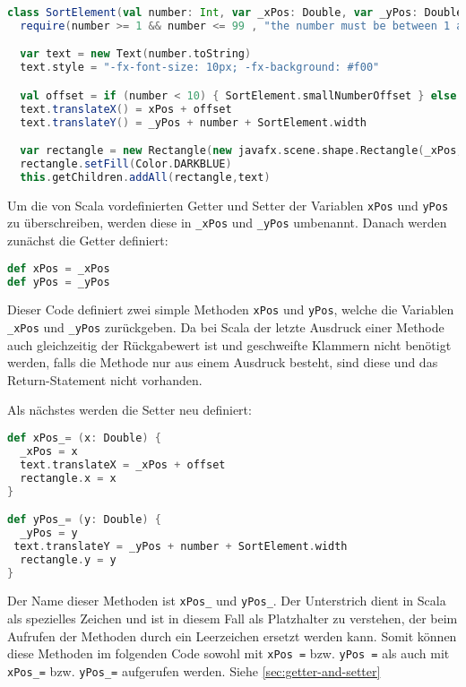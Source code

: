 \begin{lstlisting}[language=Scala]
class SortElement(val number: Int, var _xPos: Double, var _yPos: Double) extends Group with Ordered[SortElement]  {
  require(number >= 1 && number <= 99 , "the number must be between 1 and 99 (inclusive)")

  var text = new Text(number.toString)
  text.style = "-fx-font-size: 10px; -fx-background: #f00"

  val offset = if (number < 10) { SortElement.smallNumberOffset } else { 0 }
  text.translateX() = xPos + offset
  text.translateY() = _yPos + number + SortElement.width

  var rectangle = new Rectangle(new javafx.scene.shape.Rectangle(_xPos, _yPos, SortElement.width, number))
  rectangle.setFill(Color.DARKBLUE)
  this.getChildren.addAll(rectangle,text)
\end{lstlisting}

Um die von Scala vordefinierten Getter und Setter der Variablen \texttt{xPos} und \texttt{yPos} zu überschreiben, werden diese in \texttt{\_xPos} und
\texttt{\_yPos} umbenannt. Danach werden zunächst die Getter definiert:

\begin{lstlisting}[language=Scala,caption=Definiert die Setter Methoden]
def xPos = _xPos
def yPos = _yPos
\end{lstlisting}

Dieser Code definiert zwei simple Methoden \texttt{xPos} und \texttt{yPos}, welche die Variablen \texttt{\_xPos} und \texttt{\_yPos} zurückgeben. Da bei Scala der letzte Ausdruck einer Methode auch gleichzeitig der Rückgabewert ist und geschweifte Klammern nicht benötigt werden, falls die Methode nur aus einem Ausdruck besteht, sind diese und das Return-Statement nicht vorhanden.

Als nächstes werden die Setter neu definiert:

\begin{lstlisting}[language=Scala]
def xPos_= (x: Double) {
  _xPos = x
  text.translateX = _xPos + offset
  rectangle.x = x
}

def yPos_= (y: Double) {
  _yPos = y
 text.translateY = _yPos + number + SortElement.width
  rectangle.y = y
}
\end{lstlisting}

Der Name dieser Methoden ist \texttt{xPos\_} und \texttt{yPos\_}. Der Unterstrich dient in Scala als spezielles Zeichen und ist in diesem Fall als Platzhalter zu verstehen, der beim Aufrufen der Methoden durch ein Leerzeichen ersetzt werden kann. Somit können diese Methoden im folgenden Code sowohl mit \texttt{xPos =}  bzw. \texttt{yPos =} als auch mit \texttt{xPos\_=} bzw. \texttt{yPos\_=} aufgerufen werden. Siehe \ref{sec:getter-and-setter}

